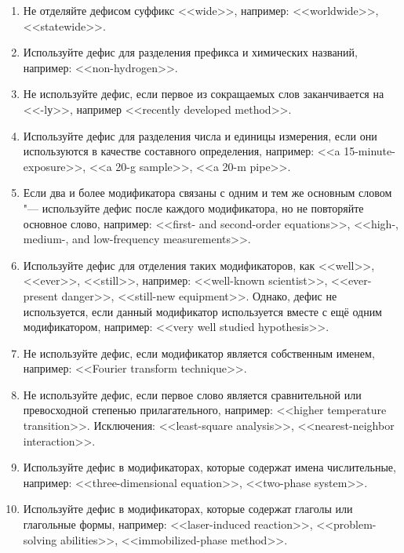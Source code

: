 \documentclass[a5paper, 10pt, twoside, numbers=enddot]{scrartcl}
\begin{document}
\begin{enumerate}
\begin{enumerate}
      \item Не отделяйте дефисом суффикс <<wide>>, например: <<worldwide>>, <<statewide>>.

      \item Используйте дефис для разделения префикса и химических названий, например:
        <<non-hydrogen>>.

      \item Не используйте дефис, если первое из сокращаемых слов заканчивается на <<-lу>>, например
        <<recently developed method>>.

      \item Используйте дефис для разделения числа и единицы измерения, если они используются в
        качестве составного определения, например: <<a 15-minute-exposure>>, <<a 20-g sample>>, <<a
        20-m pipe>>.

      \item Если два и более модификатора связаны с одним и тем же основным словом "--- используйте
        дефис после каждого модификатора, но не повторяйте основное слово, например: <<first- and
        second-order equations>>, <<high-, medium-, and low-frequency measurements>>.

      \item Используйте дефис для отделения таких модификаторов, как <<well>>, <<ever>>, <<still>>,
        например: <<well-known scientist>>, <<ever-present danger>>, <<still-new equipment>>. Однако,
        дефис не используется, если данный модификатор  используется вместе с ещё одним модификатором,
        например: <<very well studied hypothesis>>.

      \item Не используйте дефис, если модификатор является собственным именем, например: <<Fourier
        transform technique>>.

      \item Не используйте дефис, если первое слово является сравнительной или превосходной степенью
        прилагательного, например: <<higher temperature transition>>. Исключения: <<least-square
        analysis>>, <<nearest-neighbor interaction>>.

      \item Используйте дефис в модификаторах, которые содержат имена числительные, например:
        <<three-dimensional equation>>, <<two-phase system>>.

      \item Используйте дефис в модификаторах, которые содержат глаголы или глагольные формы,
        например: <<laser-induced reaction>>, <<problem-solving abilities>>, <<immobilized-phase
        method>>.


\end{enumerate}
\end{enumerate}
\end{document}
